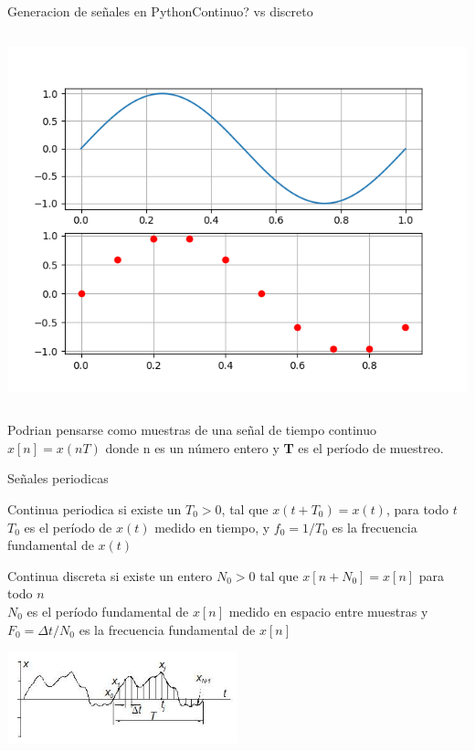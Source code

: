     \begin{frame}{Generacion de señales en Python}{Continuo? vs discreto}
      \begin{columns}[onlytextwidth]
      
         \includegraphics[width=\textwidth]{1_clase/python_continuo_vs_discreto}
            \end{columns}
            Podrian pensarse como muestras de una señal de tiempo continuo $x[n] = x (nT)$ donde n es un número entero y \textbf{T} es el período de muestreo.
         \vfill
       \end{frame}
       \begin{frame}{Señales periodicas}
         \begin{block}{Continua periodica}
            si existe un $T_0>0$, tal que $x(t+T_0)=x(t)$, para todo $t$\\
            $T_0$ es el período de $x(t)$ medido en tiempo, y $f_0=1/T_0$ es la frecuencia fundamental de $x(t)$
      \end{block}
         \begin{block}{Continua discreta}
            si existe un entero $N_0>0$ tal que $x[n+N_0]=x[n]$ para
            todo $n$ \\
            $N_0$ es el período fundamental de $x[n]$ medido en espacio entre muestras
            y  $F_0=\Delta t/N_0$ es la frecuencia fundamental de $x[n]$
      \end{block}
         \center\includegraphics[width=0.5\textwidth]{1_clase/periodica}
      \vfill
      \end{frame}
